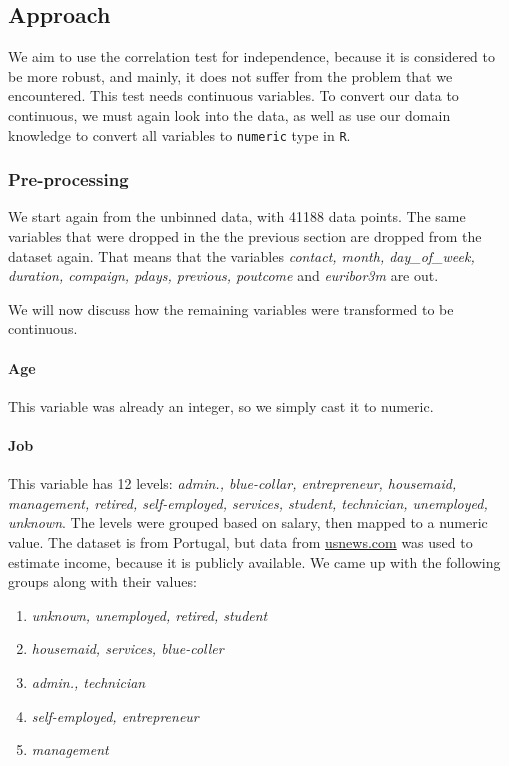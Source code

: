 \documentclass[11pt,]{article}
\providecommand{\tightlist}{%
  \setlength{\itemsep}{0pt}\setlength{\parskip}{0pt}}
\let\oldparagraph\paragraph
\renewcommand{\paragraph}[1]{\oldparagraph{#1}\mbox{}}
\begin{document}
\begin{multicols}{2}
\hypertarget{approach-1}{%
\subsection{Approach}\label{approach-1}}

We aim to use the correlation test for independence, because it is
considered to be more robust, and mainly, it does not suffer from the
problem that we encountered. This test needs continuous variables. To
convert our data to continuous, we must again look into the data, as
well as use our domain knowledge to convert all variables to
\texttt{numeric} type in \texttt{R}.

\hypertarget{pre-processing}{%
\subsubsection{Pre-processing}\label{pre-processing}}

We start again from the unbinned data, with 41188 data points. The same
variables that were dropped in the the previous section are dropped from
the dataset again. That means that the variables \emph{contact, month,
day\_of\_week, duration, compaign, pdays, previous, poutcome} and
\emph{euribor3m} are out.

We will now discuss how the remaining variables were transformed to be
continuous.

\hypertarget{age-1}{%
\paragraph{Age}\label{age-1}}

This variable was already an integer, so we simply cast it to numeric.

\hypertarget{job}{%
\paragraph{Job}\label{job}}

This variable has 12 levels: \emph{admin., blue-collar, entrepreneur,
housemaid, management, retired, self-employed, services, student,
technician, unemployed, unknown}. The levels were grouped based on
salary, then mapped to a numeric value. The dataset is from Portugal,
but data from \href{https://money.usnews.com/}{usnews.com} was used to
estimate income, because it is publicly available. We came up with the
following groups along with their values:

\begin{enumerate}
\def\labelenumi{\arabic{enumi}.}
\tightlist
\item
  \emph{unknown, unemployed, retired, student}
\item
  \emph{housemaid, services, blue-coller}
\item
  \emph{admin., technician}
\item
  \emph{self-employed, entrepreneur}
\item
  \emph{management}
\end{enumerate}


\end{multicols}
\end{document}
